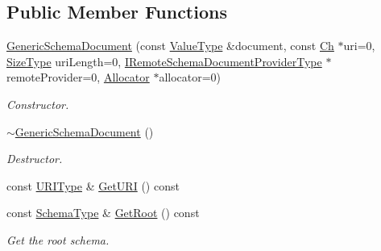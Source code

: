 \subsection*{Public Member Functions}
\begin{DoxyCompactItemize}
\item 
\mbox{\hyperlink{classrapidjson_1_1_generic_schema_document_aeebf51ef6353f6a01d6f6618da6d0865}{Generic\+Schema\+Document}} (const \mbox{\hyperlink{classrapidjson_1_1_generic_schema_document_a87eb1db271e7f57442802a5f4f6178f3}{Value\+Type}} \&document, const \mbox{\hyperlink{classrapidjson_1_1_generic_schema_document_af9b82162834b30bdcbe93cb065d0aedd}{Ch}} $\ast$uri=0, \mbox{\hyperlink{namespacerapidjson_a44eb33eaa523e36d466b1ced64b85c84}{Size\+Type}} uri\+Length=0, \mbox{\hyperlink{classrapidjson_1_1_generic_schema_document_ab2764f2258889b3262eff6293d7ca015}{I\+Remote\+Schema\+Document\+Provider\+Type}} $\ast$remote\+Provider=0, \mbox{\hyperlink{classrapidjson_1_1_allocator}{Allocator}} $\ast$allocator=0)
\begin{DoxyCompactList}\small\item\em Constructor. \end{DoxyCompactList}\item 
\mbox{\hyperlink{classrapidjson_1_1_generic_schema_document_adf6f3372013227873ed392dee1e752bf}{$\sim$\+Generic\+Schema\+Document}} ()
\begin{DoxyCompactList}\small\item\em Destructor. \end{DoxyCompactList}\item 
const \mbox{\hyperlink{classrapidjson_1_1_generic_schema_document_a72e8240701d707953bfd806cddc995b6}{U\+R\+I\+Type}} \& \mbox{\hyperlink{classrapidjson_1_1_generic_schema_document_a55b013a5f3f213d198ac0205ba6ea9b0}{Get\+U\+RI}} () const
\item 
const \mbox{\hyperlink{classrapidjson_1_1_generic_schema_document_aaf4e7f371de938025f7ed4be3b83266e}{Schema\+Type}} \& \mbox{\hyperlink{classrapidjson_1_1_generic_schema_document_a8b2ac6de85dc9c1fb4f4d0be4aeb2d6a}{Get\+Root}} () const
\begin{DoxyCompactList}\small\item\em Get the root schema. \end{DoxyCompactList}\end{DoxyCompactItemize}
